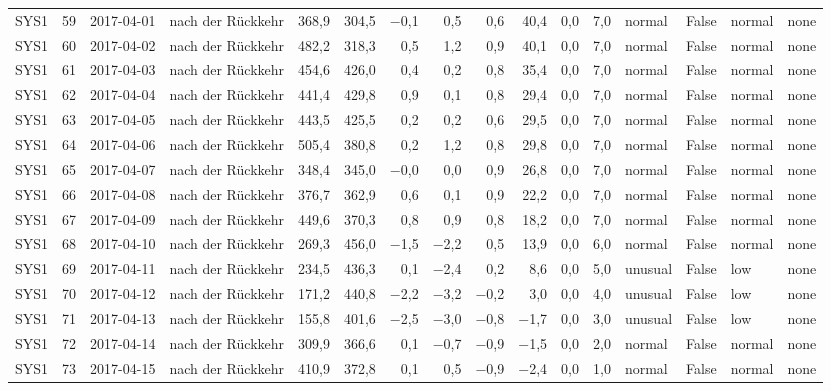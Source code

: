 \begin{tabular}{lrllrrrrrrrrlrll}
SYS1 & 59 & 2017-04-01 & nach der Rückkehr & 368,9 & 304,5 & $-$0,1 & 0,5 & 0,6 & 40,4 & 0,0 & 7,0 & normal & False & normal & none \\
SYS1 & 60 & 2017-04-02 & nach der Rückkehr & 482,2 & 318,3 & 0,5 & 1,2 & 0,9 & 40,1 & 0,0 & 7,0 & normal & False & normal & none \\
SYS1 & 61 & 2017-04-03 & nach der Rückkehr & 454,6 & 426,0 & 0,4 & 0,2 & 0,8 & 35,4 & 0,0 & 7,0 & normal & False & normal & none \\
SYS1 & 62 & 2017-04-04 & nach der Rückkehr & 441,4 & 429,8 & 0,9 & 0,1 & 0,8 & 29,4 & 0,0 & 7,0 & normal & False & normal & none \\
SYS1 & 63 & 2017-04-05 & nach der Rückkehr & 443,5 & 425,5 & 0,2 & 0,2 & 0,6 & 29,5 & 0,0 & 7,0 & normal & False & normal & none \\
SYS1 & 64 & 2017-04-06 & nach der Rückkehr & 505,4 & 380,8 & 0,2 & 1,2 & 0,8 & 29,8 & 0,0 & 7,0 & normal & False & normal & none \\
SYS1 & 65 & 2017-04-07 & nach der Rückkehr & 348,4 & 345,0 & $-$0,0 & 0,0 & 0,9 & 26,8 & 0,0 & 7,0 & normal & False & normal & none \\
SYS1 & 66 & 2017-04-08 & nach der Rückkehr & 376,7 & 362,9 & 0,6 & 0,1 & 0,9 & 22,2 & 0,0 & 7,0 & normal & False & normal & none \\
SYS1 & 67 & 2017-04-09 & nach der Rückkehr & 449,6 & 370,3 & 0,8 & 0,9 & 0,8 & 18,2 & 0,0 & 7,0 & normal & False & normal & none \\
SYS1 & 68 & 2017-04-10 & nach der Rückkehr & 269,3 & 456,0 & $-$1,5 & $-$2,2 & 0,5 & 13,9 & 0,0 & 6,0 & normal & False & normal & none \\
SYS1 & 69 & 2017-04-11 & nach der Rückkehr & 234,5 & 436,3 & 0,1 & $-$2,4 & 0,2 & 8,6 & 0,0 & 5,0 & unusual & False & low & none \\
SYS1 & 70 & 2017-04-12 & nach der Rückkehr & 171,2 & 440,8 & $-$2,2 & $-$3,2 & $-$0,2 & 3,0 & 0,0 & 4,0 & unusual & False & low & none \\
SYS1 & 71 & 2017-04-13 & nach der Rückkehr & 155,8 & 401,6 & $-$2,5 & $-$3,0 & $-$0,8 & $-$1,7 & 0,0 & 3,0 & unusual & False & low & none \\
SYS1 & 72 & 2017-04-14 & nach der Rückkehr & 309,9 & 366,6 & 0,1 & $-$0,7 & $-$0,9 & $-$1,5 & 0,0 & 2,0 & normal & False & normal & none \\
SYS1 & 73 & 2017-04-15 & nach der Rückkehr & 410,9 & 372,8 & 0,1 & 0,5 & $-$0,9 & $-$2,4 & 0,0 & 1,0 & normal & False & normal & none \\

\end{tabular}
